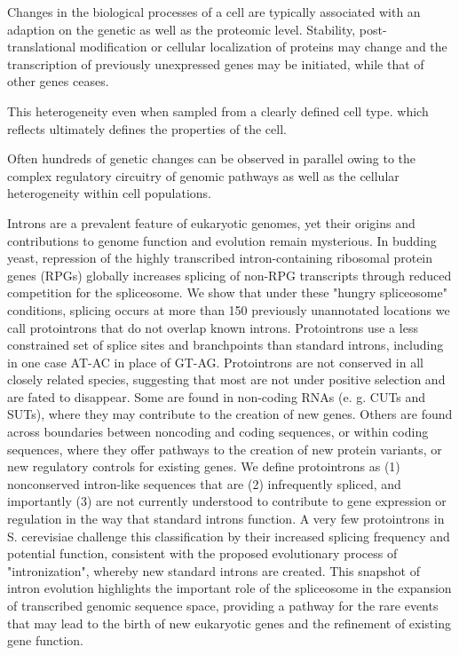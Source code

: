 Changes in the biological processes of a cell are typically associated with an adaption on the genetic as well as the proteomic level. Stability, post-translational modification or cellular localization of proteins may change and the transcription of previously unexpressed genes may be initiated, while that of other genes ceases. 

This heterogeneity  even when sampled from a clearly defined cell type. 
which reflects  ultimately defines the properties of the cell.   

Often hundreds of genetic changes can be observed in parallel owing to the complex regulatory circuitry of genomic pathways as well as the cellular heterogeneity within cell populations.





Introns are a prevalent feature of eukaryotic genomes, yet their origins and contributions to genome function and evolution remain mysterious. In budding yeast, repression of the highly transcribed intron-containing ribosomal protein genes (RPGs) globally increases splicing of non-RPG transcripts through reduced competition for the spliceosome. We show that under these "hungry spliceosome" conditions, splicing occurs at more than 150 previously unannotated locations we call protointrons that do not overlap known introns. Protointrons use a less constrained set of splice sites and branchpoints than standard introns, including in one case AT-AC in place of GT-AG. Protointrons are not conserved in all closely related species, suggesting that most are not under positive selection and are fated to disappear. Some are found in non-coding RNAs (e. g. CUTs and SUTs), where they may contribute to the creation of new genes. Others are found across boundaries between noncoding and coding sequences, or within coding sequences, where they offer pathways to the creation of new protein variants, or new regulatory controls for existing genes. We define protointrons as (1) nonconserved intron-like sequences that are (2) infrequently spliced, and importantly (3) are not currently understood to contribute to gene expression or regulation in the way that standard introns function. A very few protointrons in S. cerevisiae challenge this classification by their increased splicing frequency and potential function, consistent with the proposed evolutionary process of "intronization", whereby new standard introns are created. This snapshot of intron evolution highlights the important role of the spliceosome in the expansion of transcribed genomic sequence space, providing a pathway for the rare events that may lead to the birth of new eukaryotic genes and the refinement of existing gene function.\cite{Talkish2019}

